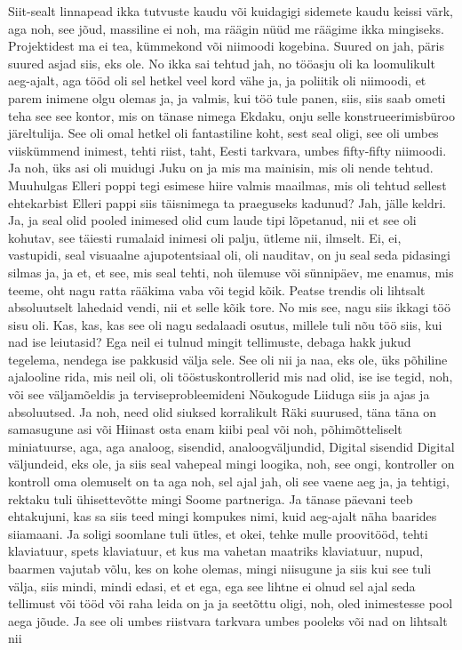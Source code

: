 Siit-sealt linnapead ikka tutvuste kaudu või kuidagigi sidemete kaudu keissi värk, aga noh, see jõud, massiline ei noh, ma räägin nüüd me räägime ikka mingiseks. Projektidest ma ei tea, kümmekond või niimoodi kogebina. Suured on jah, päris suured asjad siis, eks ole. No ikka sai tehtud jah, no tööasju oli ka loomulikult aeg-ajalt, aga tööd oli sel hetkel veel kord vähe ja, ja poliitik oli niimoodi, et parem inimene olgu olemas ja, ja valmis, kui töö tule panen, siis, siis saab ometi teha see see kontor, mis on tänase nimega Ekdaku, onju selle konstrueerimisbüroo järeltulija. See oli omal hetkel oli fantastiline koht, sest seal oligi, see oli umbes viiskümmend inimest, tehti riist, taht, Eesti tarkvara, umbes fifty-fifty niimoodi. Ja noh, üks asi oli muidugi Juku on ja mis ma mainisin, mis oli nende tehtud. Muuhulgas Elleri poppi tegi esimese hiire valmis maailmas, mis oli tehtud sellest ehtekarbist Elleri pappi siis täisnimega ta praeguseks kadunud? Jah, jälle keldri. Ja, ja seal olid pooled inimesed olid cum laude tipi lõpetanud, nii et see oli kohutav, see täiesti rumalaid inimesi oli palju, ütleme nii, ilmselt. Ei, ei, vastupidi, seal visuaalne ajupotentsiaal oli, oli nauditav, on ju seal seda pidasingi silmas ja, ja et, et see, mis seal tehti, noh ülemuse või sünnipäev, me enamus, mis teeme, oht nagu ratta rääkima vaba või tegid kõik. Peatse trendis oli lihtsalt absoluutselt lahedaid vendi, nii et selle kõik tore. No mis see, nagu siis ikkagi töö sisu oli. Kas, kas, kas see oli nagu sedalaadi osutus, millele tuli nõu töö siis, kui nad ise leiutasid? Ega neil ei tulnud mingit tellimuste, debaga hakk jukud tegelema, nendega ise pakkusid välja sele. See oli nii ja naa, eks ole, üks põhiline ajalooline rida, mis neil oli, oli tööstuskontrollerid mis nad olid, ise ise tegid, noh, või see väljamõeldis ja terviseprobleemideni Nõukogude Liiduga siis ja ajas ja absoluutsed. Ja noh, need olid siuksed korralikult Räki suurused, täna täna on samasugune asi või Hiinast osta enam kiibi peal või noh, põhimõtteliselt miniatuurse, aga, aga analoog, sisendid, analoogväljundid, Digital sisendid Digital väljundeid, eks ole, ja siis seal vahepeal mingi loogika, noh, see ongi, kontroller on kontroll oma olemuselt on ta aga noh, sel ajal jah, oli see vaene aeg ja, ja tehtigi, rektaku tuli ühisettevõtte mingi Soome partneriga. Ja tänase päevani teeb ehtakujuni, kas sa siis teed mingi kompukes nimi, kuid aeg-ajalt näha baarides siiamaani. Ja soligi soomlane tuli ütles, et okei, tehke mulle proovitööd, tehti klaviatuur, spets klaviatuur, et kus ma vahetan maatriks klaviatuur, nupud, baarmen vajutab võlu, kes on kohe olemas, mingi niisugune ja siis kui see tuli välja, siis mindi, mindi edasi, et et ega, ega see lihtne ei olnud sel ajal seda tellimust või tööd või raha leida on ja ja seetõttu oligi, noh, oled inimestesse pool aega jõude. Ja see oli umbes riistvara tarkvara umbes pooleks või nad on lihtsalt nii
